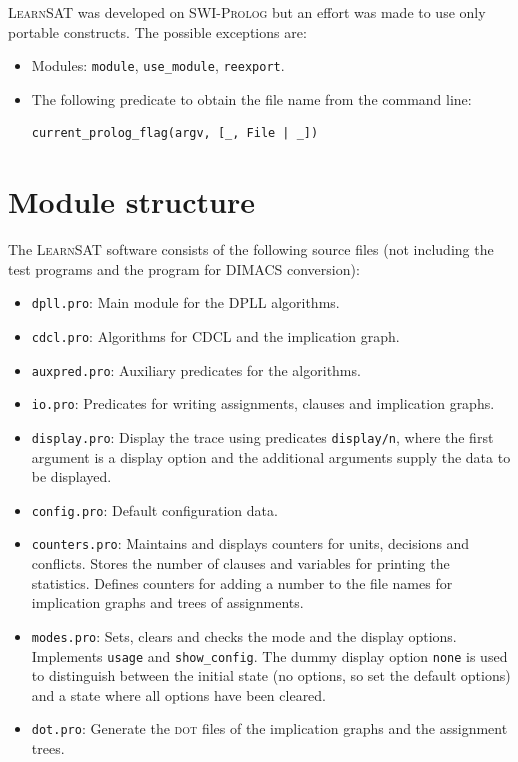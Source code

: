 \documentclass[11pt]{article}
\newcommand*{\p}[1]{\textup{\texttt{#1}}}
\newcommand*{\ls}{\textsc{LearnSAT}}
\newcommand*{\sw}{\textsc{SWI-Prolog}}
\newcommand*{\dt}{\textsc{dot}}
\begin{document}
\ls{} was developed on \sw{} but an effort was made to use only portable
constructs. The possible exceptions are:

\begin{itemize}
\item Modules: \p{module}, \p{use\_module}, \p{reexport}.
\item The following predicate to obtain the file name from the command
line:
\begin{verbatim}
current_prolog_flag(argv, [_, File | _])
\end{verbatim}
\end{itemize}

\newpage


\section{Module structure}

The \ls{} software consists of the following source files (not including
the test programs and the program for DIMACS conversion):

\begin{itemize}
\item \p{dpll.pro}: Main module for the DPLL algorithms.

\item \p{cdcl.pro}: Algorithms for CDCL and the implication graph.

\item \p{auxpred.pro}: Auxiliary predicates for the algorithms. 

\item \p{io.pro}: Predicates for writing assignments, clauses and
implication graphs.

\item \p{display.pro}: Display the trace using predicates \p{display/n},
where the first argument is a display option and the additional
arguments supply the data to be displayed.

\item \p{config.pro}: Default configuration data.

\item \p{counters.pro}: Maintains and displays counters for units,
decisions and conflicts. Stores the number of clauses and variables for
printing the statistics. Defines counters for adding a number to the
file names for implication graphs and trees of assignments.

\item \p{modes.pro}: Sets, clears and checks the mode and the display
options. Implements \p{usage} and \p{show\_config}. The dummy
display option \p{none} is used to distinguish between the initial state
(no options, so set the default options) and a state where all options
have been cleared.

\item \p{dot.pro}: Generate the \dt{} files of the implication graphs
and the assignment trees.
\end{itemize}
\end{document}
